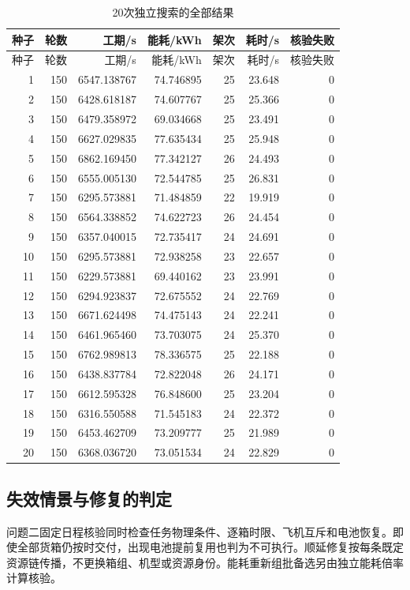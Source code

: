 \documentclass[withoutpreface,colorprint]{format}
\numberwithin{equation}{section}
\numberwithin{figure}{section}
\numberwithin{table}{section}
\begin{document}
\begin{longtable}{@{}rrrrrrr@{}}
\caption{20次独立搜索的全部结果}\label{tab:app_seeds}\\
\toprule
种子 & 轮数 & 工期/s & 能耗/kWh & 架次 & 耗时/s & 核验失败\\
\midrule
\endfirsthead
\toprule
种子 & 轮数 & 工期/s & 能耗/kWh & 架次 & 耗时/s & 核验失败\\
\midrule
\endhead
1 & 150 & 6547.138767 & 74.746895 & 25 & 23.648 & 0\\
2 & 150 & 6428.618187 & 74.607767 & 25 & 25.366 & 0\\
3 & 150 & 6479.358972 & 69.034668 & 25 & 23.491 & 0\\
4 & 150 & 6627.029835 & 77.635434 & 25 & 25.948 & 0\\
5 & 150 & 6862.169450 & 77.342127 & 26 & 24.493 & 0\\
6 & 150 & 6555.005130 & 72.544785 & 25 & 26.831 & 0\\
7 & 150 & 6295.573881 & 71.484859 & 22 & 19.919 & 0\\
8 & 150 & 6564.338852 & 74.622723 & 26 & 24.454 & 0\\
9 & 150 & 6357.040015 & 72.735417 & 24 & 24.691 & 0\\
10 & 150 & 6295.573881 & 72.938258 & 23 & 22.657 & 0\\
11 & 150 & 6229.573881 & 69.440162 & 23 & 23.991 & 0\\
12 & 150 & 6294.923837 & 72.675552 & 24 & 22.769 & 0\\
13 & 150 & 6671.624498 & 74.475143 & 24 & 22.241 & 0\\
14 & 150 & 6461.965460 & 73.703075 & 24 & 25.370 & 0\\
15 & 150 & 6762.989813 & 78.336575 & 25 & 22.188 & 0\\
16 & 150 & 6438.837784 & 72.822048 & 26 & 24.171 & 0\\
17 & 150 & 6612.595328 & 76.848600 & 25 & 23.204 & 0\\
18 & 150 & 6316.550588 & 71.545183 & 24 & 22.372 & 0\\
19 & 150 & 6453.462709 & 73.209777 & 25 & 21.989 & 0\\
20 & 150 & 6368.036720 & 73.051534 & 24 & 22.829 & 0\\
\bottomrule
\end{longtable}


\subsection{失效情景与修复的判定}
问题二固定日程核验同时检查任务物理条件、逐箱时限、飞机互斥和电池恢复。即使全部货箱仍按时交付，出现电池提前复用也判为不可执行。顺延修复按每条既定资源链传播，不更换箱组、机型或资源身份。能耗重新组批备选另由独立能耗倍率计算核验。
\end{document}
